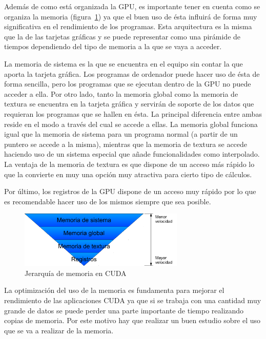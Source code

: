 Además de como está organizada la GPU, es importante tener en cuenta como se organiza la memoria (figura~\ref{fig:memcuda}) ya que el buen uso de ésta influirá de forma muy significativa en el rendimiento de los programas. Esta arquitectura es la misma que la de las tarjetas gráficas y se puede representar como una pirámide de tiempos dependiendo del tipo de memoria a la que se vaya a acceder.

La memoria de sistema es la que se encuentra en el equipo sin contar la que aporta la tarjeta gráfica. Los programas de ordenador puede hacer uso de ésta de forma sencilla, pero los programas que se ejecutan dentro de la GPU no puede acceder a ella. Por otro lado, tanto la memoria global como la memoria de textura se encuentra en la tarjeta gráfica y servirán de soporte de los datos que requieran los programas que se hallen en ésta. La principal diferencia entre ambas reside en el modo a través del cual se accede a ellas. La memoria global funciona igual que la memoria de sistema para un programa normal (a partir de un puntero se accede a la misma), mientras que la memoria de textura se accede haciendo uso de un sistema especial que añade funcionalidades como interpolado. La ventaja de la memoria de textura es que dispone de un acceso más rápido lo que la convierte en muy una opción muy atractiva para cierto tipo de cálculos.

Por último, los registros de la GPU dispone de un acceso muy rápido por lo que es recomendable hacer uso de los mismos siempre que sea posible.

\begin{figure}
	\centering
	\includegraphics[width=0.7\textwidth]{images/MemoriaCuda.pdf}
	\caption{Jerarquía de memoria en CUDA}\label{fig:memcuda}
\end{figure}

La optimización del uso de la memoria es fundamenta para mejorar el rendimiento de las aplicaciones CUDA ya que si se trabaja con una cantidad muy grande de datos se puede perder una parte importante de tiempo realizando copias de memoria. Por este motivo hay que realizar un buen estudio sobre el uso que se va a realizar de la memoria.

